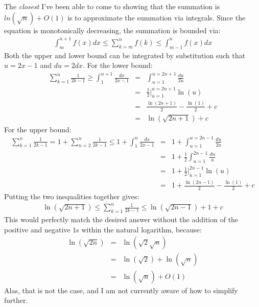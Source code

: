 The \textit{closest} I've been able to come to showing that the summation is $ln(\sqrt{n}) + O(1)$ is to approximate the summation via integrals. Since the equation is monotonically decreasing, the summation is bounded via:
\begin{eqnarray*}
	\int_m^{n+1} f(x)dx \leq \sum_{k=m}^n f(k) \leq \int_{m-1}^n f(x)dx
\end{eqnarray*}
Both the upper and lower bound can be integrated by substitution such that $u=2x-1$ and $du=2dx$. For the lower bound:
\begin{eqnarray*}
	\sum_{k=1}^n \frac{1}{2k-1} \geq \int_1^{n+1} \frac{dx}{2x-1} & = & \int_{u=1}^{u=2n+1} \frac{du}{2u} \\
	& = & \frac{1}{2} \biggr\vert_{u=1}^{u=2n+1} \ln(u) \\
	& = & \frac{\ln(2n+1)}{2} - \frac{\ln(1)}{2} + c \\
	& = & \ln(\sqrt{2n+1}) + c
\end{eqnarray*}
For the upper bound:
\begin{eqnarray*}
	\sum_{k=1}^n \frac{1}{2k-1} = 1 + \sum_{n=2}^n \frac{1}{2k-1}\leq 1 + \int_1^n \frac{dx}{2x-1} & = & 1 + \int_{u=1}^{u=2n-1} \frac{du}{2u} \\
	& = & 1 + \frac{1}{2} \int_{u=1}^{2n-1} \frac{du}{u} \\
	& = & 1 + \frac{1}{2} \biggr\vert_{u=1}^{2n-1} \ln(u) \\
	& = & 1 + \frac{\ln(2n-1)}{2} - \frac{\ln(1)}{2} + c
\end{eqnarray*}
Putting the two inequalities together gives:
\begin{eqnarray*}
	\ln(\sqrt{2n+1}) \leq \sum_{k=1}^n \frac{1}{2k-1} \leq \ln(\sqrt{2n-1}) + 1 + c
\end{eqnarray*}
This would perfectly match the desired answer without the addition of the positive and negative $1$s within the natural logarithm, because:
\begin{eqnarray*}
	\ln(\sqrt{2n}) & = & \ln(\sqrt{2}\sqrt{n}) \\
	& = & \ln(\sqrt{2}) + \ln(\sqrt{n}) \\
	& = & \ln(\sqrt{n}) + O(1)
\end{eqnarray*}
Alas, that is not the case, and I am not currently aware of how to simplify further.
